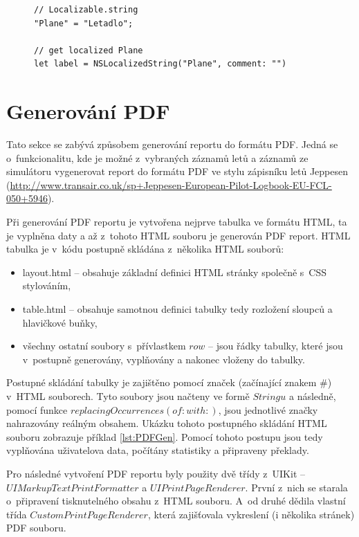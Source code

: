 \documentclass[thesis=M,czech]{FITthesis}[2012/06/26]
\begin{document}
\begin{figure}
\begin{minipage}{\linewidth}
\begin{lstlisting}[caption={Ukázka použití $Localizable.string$},label={lst:locString}]
// Localizable.string
"Plane" = "Letadlo";

// get localized Plane
let label = NSLocalizedString("Plane", comment: "")
\end{lstlisting}
\end{minipage}
\end{figure}

\section{Generování PDF}
Tato sekce se zabývá způsobem generování reportu do formátu PDF. Jedná se o~funkcionalitu, kde je možné z~vybraných záznamů letů a záznamů ze simulátoru vygenerovat report do formátu PDF ve stylu zápisníku letů Jeppesen (\url{http://www.transair.co.uk/sp+Jeppesen-European-Pilot-Logbook-EU-FCL-050+5946}).

Při generování PDF reportu je vytvořena nejprve tabulka ve formátu HTML, ta je vyplněna daty a až z~tohoto HTML souboru je generován PDF report. HTML tabulka je v~kódu postupně skládána z~několika HTML souborů:
\begin{itemize}
\item layout.html -- obsahuje základní definici HTML stránky společně s~CSS stylováním,
\item table.html -- obsahuje samotnou definici tabulky tedy rozložení sloupců  a hlavičkové buňky,
\item všechny ostatní soubory s~přívlastkem $row$ -- jsou řádky tabulky, které jsou v~postupně generovány, vyplňovány a nakonec vloženy do tabulky.
\end{itemize}
Postupné skládání tabulky je zajištěno pomocí značek (začínající znakem \#) v~HTML souborech. Tyto soubory jsou načteny ve formě $Stringu$ a následně, pomocí funkce $replacingOccurrences(of:with:)$, jsou jednotlivé značky nahrazovány reálným obsahem. Ukázku tohoto postupného skládání HTML souboru zobrazuje příklad \ref{lst:PDFGen}. Pomocí tohoto postupu jsou tedy vyplňována uživatelova data, počítány statistiky a připraveny překlady.

Pro následné vytvoření PDF reportu byly použity dvě třídy z~UIKit -- $UIMarkupTextPrintFormatter$ a $UIPrintPageRenderer$. První z~nich se starala o~připravení tisknutelného obsahu z~HTML souboru. A~od druhé dědila vlastní třída $CustomPrintPageRenderer$, která zajišťovala vykreslení (i několika stránek) PDF souboru.  
\end{document}
